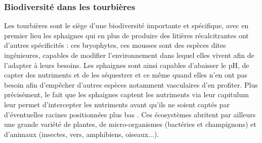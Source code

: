 \subsubsection{Biodiversité dans les tourbières}



Les tourbières sont le siège d'une biodiversité importante et spécifique, avec en premier lieu les sphaignes qui en plus de produire des litières récalcitrantes ont d'autres spécificités : 
ces bryophytes, ces mousses sont des espèces dites ingénieures, capables de modifier l'environnement dans lequel elles vivent afin de l'adapter à leurs besoins.
Les sphaignes sont ainsi capables d'abaisser le pH, de capter des nutriments et de les séquestrer et ce même quand elles n'en ont pas besoin afin d'empêcher d'autres espèces notamment vasculaires d'en profiter.
Plus précisément, le fait que les sphaignes captent les nutriments via leur capitulum leur permet d'intercepter les nutriments avant qu'ils ne soient captés par d'éventuelles racines positionnées plus bas \citep{malmer1994,svensson1995}.
Ces écosystèmes abritent par ailleurs une grande variété de plantes, de micro-organismes (bactéries et champignons) et d'animaux (insectes, vers, amphibiens, oiseaux...).

